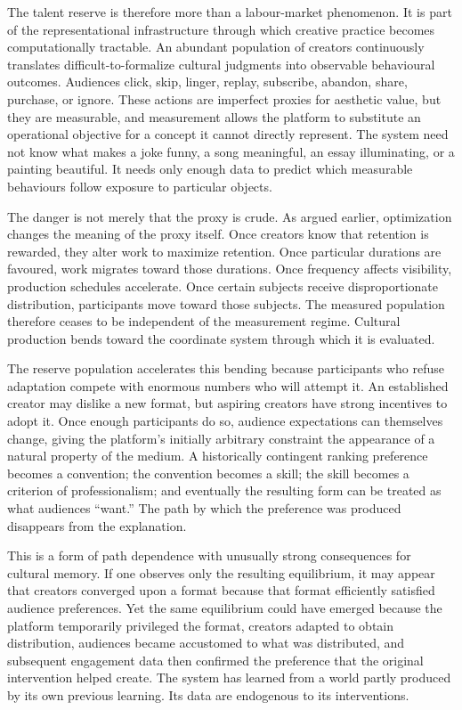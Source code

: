 \documentclass[11pt]{article}
\begin{document}
The talent reserve is therefore more than a labour-market phenomenon. It is part of the representational infrastructure through which creative practice becomes computationally tractable. An abundant population of creators continuously translates difficult-to-formalize cultural judgments into observable behavioural outcomes. Audiences click, skip, linger, replay, subscribe, abandon, share, purchase, or ignore. These actions are imperfect proxies for aesthetic value, but they are measurable, and measurement allows the platform to substitute an operational objective for a concept it cannot directly represent. The system need not know what makes a joke funny, a song meaningful, an essay illuminating, or a painting beautiful. It needs only enough data to predict which measurable behaviours follow exposure to particular objects.

The danger is not merely that the proxy is crude. As argued earlier, optimization changes the meaning of the proxy itself. Once creators know that retention is rewarded, they alter work to maximize retention. Once particular durations are favoured, work migrates toward those durations. Once frequency affects visibility, production schedules accelerate. Once certain subjects receive disproportionate distribution, participants move toward those subjects. The measured population therefore ceases to be independent of the measurement regime. Cultural production bends toward the coordinate system through which it is evaluated.

The reserve population accelerates this bending because participants who refuse adaptation compete with enormous numbers who will attempt it. An established creator may dislike a new format, but aspiring creators have strong incentives to adopt it. Once enough participants do so, audience expectations can themselves change, giving the platform's initially arbitrary constraint the appearance of a natural property of the medium. A historically contingent ranking preference becomes a convention; the convention becomes a skill; the skill becomes a criterion of professionalism; and eventually the resulting form can be treated as what audiences ``want.'' The path by which the preference was produced disappears from the explanation.

This is a form of path dependence with unusually strong consequences for cultural memory. If one observes only the resulting equilibrium, it may appear that creators converged upon a format because that format efficiently satisfied audience preferences. Yet the same equilibrium could have emerged because the platform temporarily privileged the format, creators adapted to obtain distribution, audiences became accustomed to what was distributed, and subsequent engagement data then confirmed the preference that the original intervention helped create. The system has learned from a world partly produced by its own previous learning. Its data are endogenous to its interventions.
\end{document}
